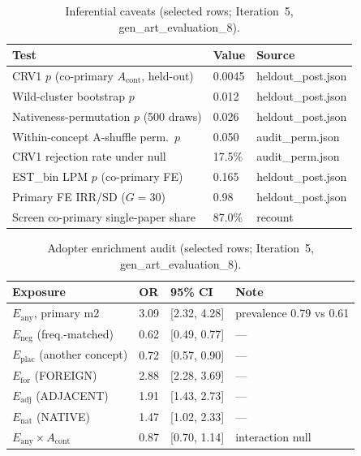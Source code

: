 \documentclass[11pt,letterpaper]{article}
\begin{document}
\begin{table}[!htbp]
\centering
\caption{Inferential caveats (selected rows; Iteration~5, gen\_art\_evaluation\_8).}
\label{tab:caveats}
{\small
\begin{tabular}{L{5.5cm}R{1.3cm}L{3.5cm}}
\toprule
Test & Value & Source \\
\midrule
CRV1 $p$ (co-primary $A_{\mathrm{cont}}$, held-out) & 0.0045 & heldout\_post.json \\
Wild-cluster bootstrap $p$ & 0.012 & heldout\_post.json \\
Nativeness-permutation $p$ (500 draws) & 0.026 & heldout\_post.json \\
Within-concept A-shuffle perm.\ $p$ & 0.050 & audit\_perm.json \\
CRV1 rejection rate under null & 17.5\% & audit\_perm.json \\
EST\_bin LPM $p$ (co-primary FE) & 0.165 & heldout\_post.json \\
Primary FE IRR/SD ($G = 30$) & 0.98 & heldout\_post.json \\
Screen co-primary single-paper share & 87.0\% & recount \\
\bottomrule
\end{tabular}
}
\end{table}

\begin{table}[!htbp]
\centering
\caption{Adopter enrichment audit (selected rows; Iteration~5, gen\_art\_evaluation\_8).}
\label{tab:adopter_audit}
{\small
\begin{tabular}{L{5cm}R{1cm}L{2.5cm}L{3cm}}
\toprule
Exposure & OR & 95\% CI & Note \\
\midrule
$E_{\mathrm{any}}$, primary m2 & 3.09 & [2.32, 4.28] & prevalence 0.79 vs 0.61 \\
$E_{\mathrm{neg}}$ (freq.-matched) & 0.62 & [0.49, 0.77] & --- \\
$E_{\mathrm{plac}}$ (another concept) & 0.72 & [0.57, 0.90] & --- \\
$E_{\mathrm{for}}$ (FOREIGN) & 2.88 & [2.28, 3.69] & --- \\
$E_{\mathrm{adj}}$ (ADJACENT) & 1.91 & [1.43, 2.73] & --- \\
$E_{\mathrm{nat}}$ (NATIVE) & 1.47 & [1.02, 2.33] & --- \\
$E_{\mathrm{any}} \times A_{\mathrm{cont}}$ & 0.87 & [0.70, 1.14] & interaction null \\
\bottomrule
\end{tabular}
}
\end{table}
\end{document}
